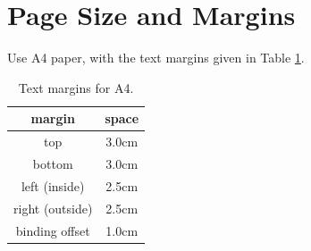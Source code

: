 \documentclass{cslthse-msc}
\begin{document}
\section{Page Size and Margins}
Use A4 paper, with the text margins given in Table \ref{tab:margins}.
\begin{table}[!hbt]
\centering
\caption{Text margins for A4.}\label{tab:margins}
\begin{tabular}{cc}
\hline
\textbf{margin} & \textbf{space} \\
\hline 
top & 3.0cm\\ 

bottom & 3.0cm \\ 
 
left (inside) & 2.5cm \\ 

right (outside) & 2.5cm \\ 

binding offset & 1.0cm \\ 
\hline 
\end{tabular} 
\end{table}
\end{document}
